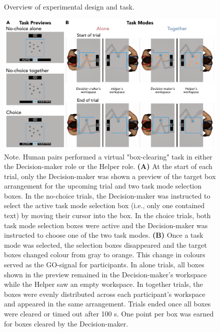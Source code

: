 \documentclass[
  man,
  floatsintext,
  longtable,
  nolmodern,
  notxfonts,
  notimes,
  colorlinks=true,linkcolor=blue,citecolor=blue,urlcolor=blue]{apa7}
\begin{document}
\clearpage

\begin{figure}[htbp]
\caption{Overview of experimental design and task.}
\centering
\includegraphics[scale=1.00]{../../figs/fig1.pdf}
\setlength{\belowcaptionskip}{-2em}
\caption*{\singlespacing \small Note. \normalfont Human pairs performed a virtual "box-clearing" task in either the Decision-maker role or the Helper role. \textbf{(A)} At the start of each trial, only the Decision-maker was shown a preview of the target box arrangement for the upcoming trial and two task mode selection boxes. In the no-choice trials, the Decision-maker was instructed to select the active task mode selection box (i.e., only one contained text) by moving their cursor into the box. In the choice trials, both task mode selection boxes were active and the Decision-maker was instructed to choose one of the two task modes. \textbf{(B)} Once a task mode was selected, the selection boxes disappeared and the target boxes changed colour from gray to orange. This change in colours served as the GO-signal for participants. In alone trials, all boxes shown in the preview remained in the Decision-maker's workspace while the Helper saw an empty workspace. In together trials, the boxes were evenly distributed across each participant's workspace and appeared in the same arrangement. Trials ended once all boxes were cleared or timed out after 100 s. One point per box was earned for boxes cleared by the Decision-maker.}
\label{fig:fig1}
\end{figure}

\clearpage
\end{document}

